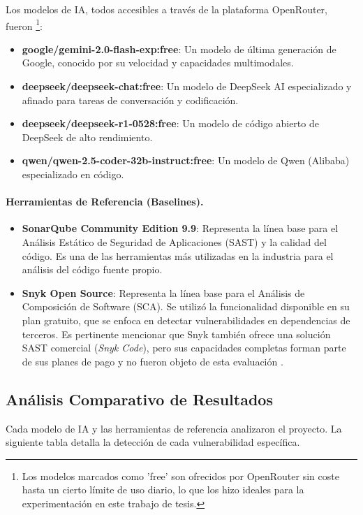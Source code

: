 Los modelos de IA, todos accesibles a través de la plataforma OpenRouter, fueron \footnote{Los modelos marcados como 'free' son ofrecidos por OpenRouter sin coste hasta un cierto límite de uso diario, lo que los hizo ideales para la experimentación en este trabajo de tesis.}:
\begin{itemize}
    \item \textbf{google/gemini-2.0-flash-exp:free}: Un modelo de última generación de Google, conocido por su velocidad y capacidades multimodales.
    \item \textbf{deepseek/deepseek-chat:free}: Un modelo de DeepSeek AI especializado y afinado para tareas de conversación y codificación.
    \item \textbf{deepseek/deepseek-r1-0528:free}: Un modelo de código abierto de DeepSeek de alto rendimiento.
    \item \textbf{qwen/qwen-2.5-coder-32b-instruct:free}: Un modelo de Qwen (Alibaba) especializado en código.
\end{itemize}

\paragraph{Herramientas de Referencia (Baselines).}
\begin{itemize}
\item \textbf{SonarQube Community Edition 9.9}: Representa la línea base para el Análisis Estático de Seguridad de
Aplicaciones (SAST) y la calidad del código. Es una de las herramientas más utilizadas en la industria para el análisis del código fuente propio.
\item \textbf{Snyk Open Source}: Representa la línea base para el Análisis de Composición de Software (SCA). Se utilizó la funcionalidad disponible en su plan gratuito, que se enfoca en detectar vulnerabilidades en dependencias de terceros. Es pertinente mencionar que Snyk también ofrece una solución SAST comercial (\textit{Snyk Code}), pero sus capacidades completas forman parte de sus planes de pago y no fueron objeto de esta evaluación \cite{snyk_plans}.
\end{itemize}

\subsection{Análisis Comparativo de Resultados}
\label{subsec:analisis_comparativo_resultados}
Cada modelo de IA y las herramientas de referencia analizaron el proyecto. La siguiente tabla detalla la detección de cada vulnerabilidad específica.

